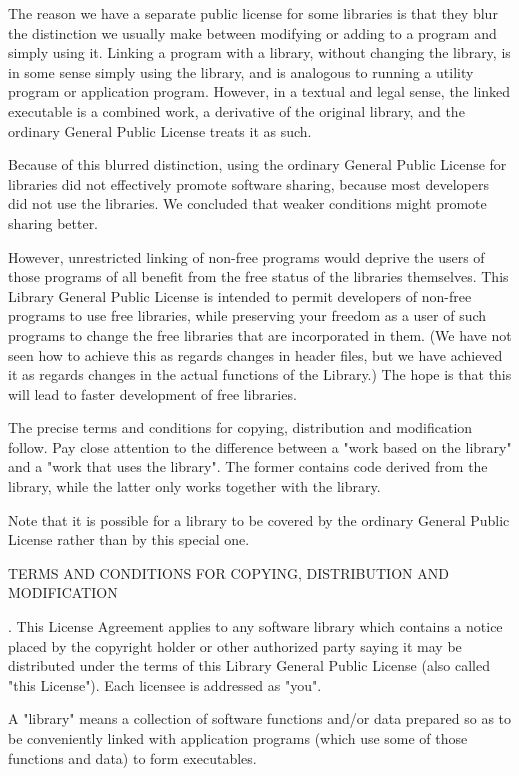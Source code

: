 The reason we have a separate public license for some libraries is that they blur the distinction we usually make between modifying or adding to a program and simply using it. Linking a program with a library, without changing the library, is in some sense simply using the library, and is analogous to running a utility program or application program. However, in a textual and legal sense, the linked executable is a combined work, a derivative of the original library, and the ordinary General Public License treats it as such. 

Because of this blurred distinction, using the ordinary General Public License for libraries did not effectively promote software sharing, because most developers did not use the libraries. We concluded that weaker conditions might promote sharing better. 

However, unrestricted linking of non-free programs would deprive the users of those programs of all benefit from the free status of the libraries themselves. This Library General Public License is intended to permit developers of non-free programs to use free libraries, while preserving your freedom as a user of such programs to change the free libraries that are incorporated in them. (We have not seen how to achieve this as regards changes in header files, but we have achieved it as regards changes in the actual functions of the Library.) The hope is that this will lead to faster development of free libraries. 

The precise terms and conditions for copying, distribution and modification follow. Pay close attention to the difference between a "work based on the library" and a "work that uses the library". The former contains code derived from the library, while the latter only works together with the library. 

Note that it is possible for a library to be covered by the ordinary General Public License rather than by this special one. 

\vparasmall
TERMS AND CONDITIONS FOR COPYING, DISTRIBUTION AND MODIFICATION

. This License Agreement applies to any software library which contains a notice placed by the copyright holder or other authorized party saying it may be distributed under the terms of this Library General Public License (also called "this License"). Each licensee is addressed as "you". 

A "library" means a collection of software functions and/or data prepared so as to be conveniently linked with application programs (which use some of those functions and data) to form executables. 

